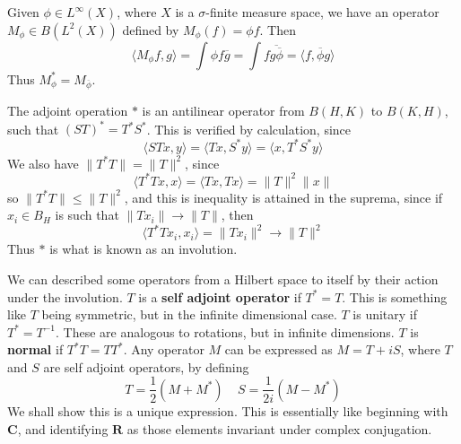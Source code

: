 \begin{example}
    Given $\phi \in L^\infty(X)$, where $X$ is a $\sigma$-finite measure space, we have an operator $M_\phi \in B(L^2(X))$ defined by $M_\phi(f) = \phi f$. Then
    \[ \langle M_\phi f, g \rangle = \int \phi f \overline{g} = \int f \overline{g \overline{\phi}} = \langle f, \overline{\phi} g \rangle \]
    Thus $M_\phi^* = M_{\overline{\phi}}$.
\end{example}

The adjoint operation $*$ is an antilinear operator from $B(H,K)$ to $B(K,H)$, such that $(ST)^* = T^*S^*$. This is verified by calculation, since
%
\[ \langle ST x, y \rangle = \langle Tx, S^* y \rangle = \langle x, T^*S^* y \rangle \]
%
We also have $\| T^*T \| = \| T \|^2$, since
%
\[ \langle T^*T x, x \rangle = \langle Tx, Tx \rangle = \| T \|^2 \| x \| \]
%
so $\| T^*T \| \leq \| T \|^2$, and this is inequality is attained in the suprema, since if $x_i \in B_H$ is such that $\| T x_i \| \to \| T \|$, then
%
\[ \langle T^*T x_i, x_i \rangle = \| T x_i \|^2 \to \| T \|^2 \]
%
Thus $*$ is what is known as an involution.

We can described some operators from a Hilbert space to itself by their action under the involution. $T$ is a {\bf self adjoint operator} if $T^* = T$. This is something like $T$ being symmetric, but in the infinite dimensional case. $T$ is unitary if $T^* = T^{-1}$. These are analogous to rotations, but in infinite dimensions. $T$ is {\bf normal} if $T^*T = TT^*$. Any operator $M$ can be expressed as $M = T + iS$, where $T$ and $S$ are self adjoint operators, by defining
%
\[ T = \frac{1}{2}(M + M^*)\ \ \ \ \ S = \frac{1}{2i}(M - M^*) \]
%
We shall show this is a unique expression. This is essentially like beginning with $\mathbf{C}$, and identifying $\mathbf{R}$ as those elements invariant under complex conjugation.

